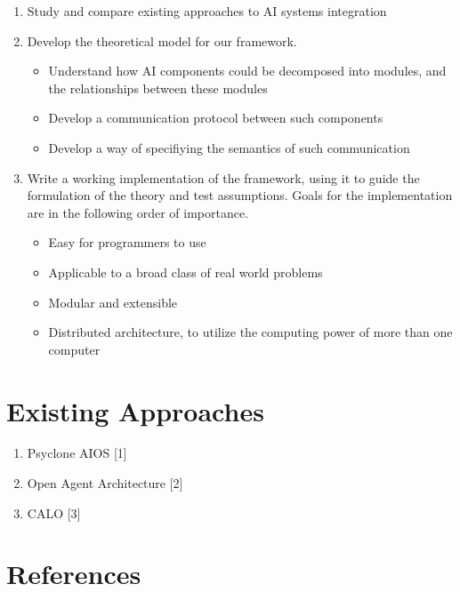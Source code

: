 \documentclass[14pt]{article} %
\begin{document}
\begin{enumerate}
	\item Study and compare existing approaches to AI systems integration
	\item Develop the theoretical model for our framework.
		\begin{itemize}
			\item Understand how AI components could be decomposed into modules, and the relationships between these modules
			\item Develop a communication protocol between such components
			\item Develop a way of specifiying the semantics of such communication
		\end{itemize}
	\item Write a working implementation of the framework, using it to guide the formulation of the theory and test assumptions. Goals for the implementation are in the following order of importance.
		\begin{itemize}
			\item Easy for programmers to use
			\item Applicable to a broad class of real world problems
			\item Modular and extensible
			\item Distributed architecture, to utilize the computing power of more than one computer
		\end{itemize}

\end{enumerate}

\section{Existing Approaches}

\begin {enumerate}
	\item Psyclone AIOS [1]
	\item Open Agent Architecture [2] 
	\item CALO [3]
\end{enumerate}

\section{References}
\end{document}
